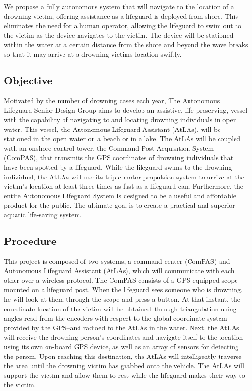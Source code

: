 \documentclass[11pt]{article}
\begin{document}
We propose a fully autonomous system that will navigate to the location of a drowning victim, offering assistance as a lifeguard is deployed from shore. This eliminates the need for a human operator, allowing the lifeguard to swim out to the victim as the device navigates to the victim. The device will be stationed within the water at a certain distance from the shore and beyond the wave breaks so that it may arrive at a drowning victims location swiftly.  

\subsection*{Objective}

Motivated by the number of drowning cases each year, The Autonomous Lifeguard Senior Design Group aims to develop an assistive, life-preserving, vessel with the capability of navigating to and locating drowning individuals in open water. This vessel, the Autonomous Lifeguard Assistant (AtLAs), will be stationed in the open water on a beach or in a lake. The AtLAs will be coupled with an onshore control tower, the Command Post Acquisition System (ComPAS), that transmits the GPS coordinates of drowning individuals that have been spotted by a lifeguard. While the lifeguard swims to the drowning individual, the AtLAs will use its triple motor propulsion system to arrive at the victim's location at least three times as fast as a lifeguard can. Furthermore, the entire Autonomous Lifeguard System is designed to be a useful and affordable product for the public. The ultimate goal is to create a practical and superior aquatic life-saving system.

\subsection*{Procedure}

This project is composed of two systems, a command center (ComPAS) and Autonomous Lifeguard Assistant (AtLAs), which will communicate with each other over a wireless protocol. The ComPAS consists of a GPS-equipped scope mounted on a lifeguard post. When the lifeguard sees someone who is drowning, he will look at them through the scope and press a button. At that instant, the coordinate location of the victim will be obtained--through triangulation using angles read from the encoders with respect to the global coordinate system provided by the GPS--and radioed to the AtLAs in the water. Next, the AtLAs will receive the drowning person's coordinates and navigate itself to the location using its own on-board GPS device, as well as an array of sensors for detecting the person. Upon reaching this destination, the AtLAs will intelligently traverse the area until the drowning victim has grabbed onto the vehicle. The AtLAs will support the victim and allow them to rest while the lifeguard makes their way to the victim.\\
\end{document}
